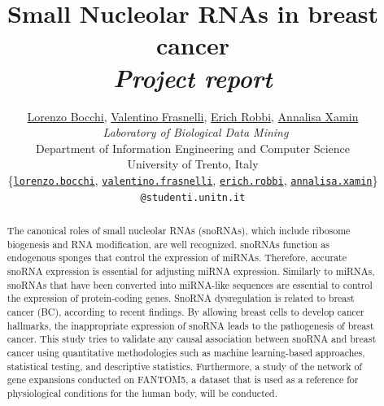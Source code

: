 \documentclass[journal]{IEEEtran}
\begin{document}
\title{\vspace{-0.5em}Small Nucleolar RNAs in breast cancer\\[0.1em]\huge \textit{Project report}}
\author{\href{https://github.com/bocchilorenzo}{Lorenzo Bocchi}, \href{https://github.com/valefras}{Valentino Frasnelli}, \href{https://github.com/erich-r}{Erich Robbi}, \href{https://github.com/annalisaxamin}{Annalisa Xamin} \vspace{0.25cm}\\\ \textit{Laboratory of Biological Data Mining}\\ Department of Information Engineering and Computer Science\\University of Trento, Italy\\

\normalsize\{\href{mailto:lorenzo.bocchi@studenti.unitn.it}{\texttt{lorenzo.bocchi}},  \href{mailto:valentino.frasnelli@studenti.unitn.it}{\texttt{valentino.frasnelli}}, \href{mailto:erich.robbi@studenti.unitn.it}{\texttt{erich.robbi}},  \href{mailto:annalisa.xamin@studenti.unitn.it}{\texttt{annalisa.xamin}}\} \texttt{@studenti.unitn.it}\vspace{-1em}}%


\maketitle

\begin{abstract}
The canonical roles of small nucleolar RNAs (snoRNAs), which include ribosome biogenesis and RNA modification, are well recognized. snoRNAs function as endogenous sponges that control the expression of miRNAs. Therefore, accurate snoRNA expression is essential for adjusting miRNA expression. Similarly to miRNAs, snoRNAs that have been converted into miRNA-like sequences are essential to control the expression of protein-coding genes. SnoRNA dysregulation is related to breast cancer (BC), according to recent findings. By allowing breast cells to develop cancer hallmarks, the inappropriate expression of snoRNA leads to the pathogenesis of breast cancer.
This study tries to validate any causal association between snoRNA and breast cancer using quantitative methodologies such as machine learning-based approaches, statistical testing, and descriptive statistics.
Furthermore, a study of the network of gene expansions conducted on FANTOM5, a dataset that is used as a reference for physiological conditions for the human body, will be conducted.
\end{abstract}
\end{document}
